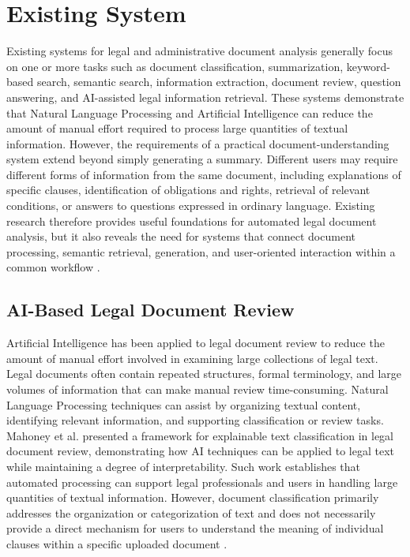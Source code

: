 \documentclass[12pt,a4paper,oneside]{report}
\begin{document}
\section{Existing System}

Existing systems for legal and administrative document analysis generally focus
on one or more tasks such as document classification, summarization,
keyword-based search, semantic search, information extraction, document review,
question answering, and AI-assisted legal information retrieval. These systems
demonstrate that Natural Language Processing and Artificial Intelligence can
reduce the amount of manual effort required to process large quantities of
textual information. However, the requirements of a practical
document-understanding system extend beyond simply generating a summary.
Different users may require different forms of information from the same
document, including explanations of specific clauses, identification of
obligations and rights, retrieval of relevant conditions, or answers to
questions expressed in ordinary language. Existing research therefore provides
useful foundations for automated legal document analysis, but it also reveals
the need for systems that connect document processing, semantic retrieval,
generation, and user-oriented interaction within a common workflow
\cite{mahoney2019,kandula2023,pramanik2025}.

\subsection{AI-Based Legal Document Review}

Artificial Intelligence has been applied to legal document review to reduce
the amount of manual effort involved in examining large collections of legal
text. Legal documents often contain repeated structures, formal terminology,
and large volumes of information that can make manual review time-consuming.
Natural Language Processing techniques can assist by organizing textual
content, identifying relevant information, and supporting classification or
review tasks. Mahoney et al. presented a framework for explainable text
classification in legal document review, demonstrating how AI techniques can
be applied to legal text while maintaining a degree of interpretability. Such
work establishes that automated processing can support legal professionals and
users in handling large quantities of textual information. However, document
classification primarily addresses the organization or categorization of text
and does not necessarily provide a direct mechanism for users to understand
the meaning of individual clauses within a specific uploaded document
\cite{mahoney2019}.
\end{document}
